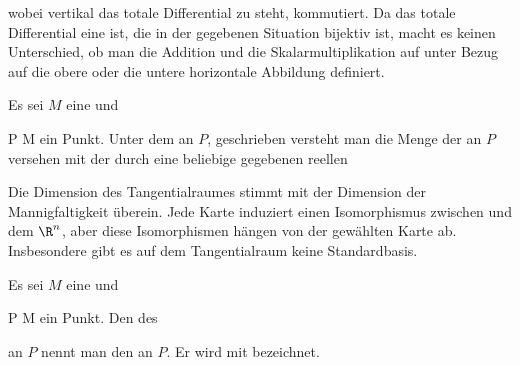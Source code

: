 {{ {  }

wobei vertikal das totale Differential zu
 steht, kommutiert. Da das totale Differential eine
ist, die in der gegebenen Situation bijektiv ist, macht es keinen Unterschied, ob man die Addition und die Skalarmultiplikation auf
 unter Bezug auf die obere oder die untere horizontale Abbildung definiert.}
{}

}

{}
{

Es sei $M$ eine
und

\mavergleichskette
{\vergleichskette
{ P
}
{ \in }{ M
}
{  }{
}
{    }{
}
{   }{
}
}
{}{}{}
ein Punkt. Unter dem  an $P$, geschrieben
 versteht man die Menge der
an $P$ versehen mit der durch eine beliebige
gegebenen reellen

}

Die Dimension des Tangentialraumes stimmt mit der Dimension der Mannigfaltigkeit überein. Jede Karte induziert einen Isomorphismus zwischen
 und dem $\R^n$, aber diese Isomorphismen hängen von der gewählten Karte ab. Insbesondere gibt es auf dem Tangentialraum keine Standardbasis.

{}
{

Es sei $M$ eine
und

\mavergleichskette
{\vergleichskette
{ P
}
{ \in }{ M
}
{  }{
}
{    }{
}
{   }{
}
}
{}{}{}
ein Punkt. Den
des

 an $P$ nennt man den  an $P$.  Er wird mit
 {  }
 bezeichnet.

}

